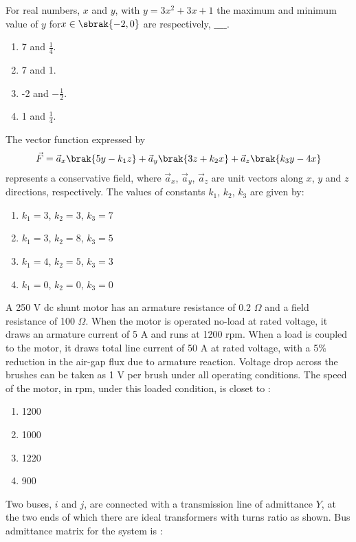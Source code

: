 \item For real numbers, $x$ and $y$, with $y = 3x^2 + 3x + 1$ the maximum and minimum value of $y$ for$x \in \sbrak{-2, 0}$ are respectively, $\_\_\_\_$.
\begin{enumerate}
    \item 7 and $\frac{1}{4}$.
    \item 7 and 1.
    \item -2 and $-\frac{1}{2}$.
    \item 1 and $\frac{1}{4}$. \\ 
\end{enumerate}
\item The vector function expressed by
\begin{align*}
    \vec{F} = \vec{a}_x\brak{5y - k_1z} + \vec{a}_y\brak{3z + k_2x}  +\vec{a}_z\brak{k_3y - 4x}
\end{align*}
represents a conservative field, where $\vec{a}_x$, $\vec{a}_y$, $\vec{a}_z$ are unit vectors along $x$, $y$ and $z$ directions, respectively. The values of constants $k_1$, $k_2$, $k_3$ are given by:
\begin{enumerate}
    \item $k_1 = 3$, $k_2 = 3$, $k_3 = 7$
    \item $k_1 = 3$, $k_2 = 8$, $k_3 = 5$
    \item $k_1 = 4$, $k_2 = 5$, $k_3 = 3$
    \item $k_1 = 0$, $k_2 = 0$, $k_3 = 0$ \\
\end{enumerate}
\item A 250 V dc shunt motor has an armature resistance of 0.2 $\Omega$ and a field resistance of 100 $\Omega$. When the motor is operated no-load at rated voltage, it draws an armature current of 5 A and runs at 1200 rpm. When a load is coupled to the motor, it draws total line current of 50 A at rated voltage, with a 5\% reduction in the air-gap flux due to armature reaction. Voltage drop across the brushes can be taken as 1 V per brush under all operating conditions. The speed of the motor, in rpm, under this loaded condition,
is closet to :
\begin{enumerate}
    \item 1200
    \item 1000
    \item 1220
    \item 900 \\
\end{enumerate}
\item Two buses, $i$ and $j$, are connected with a transmission line of admittance $Y$, at the two ends of which there are ideal transformers with turns ratio as shown. Bus admittance matrix for the system is :
